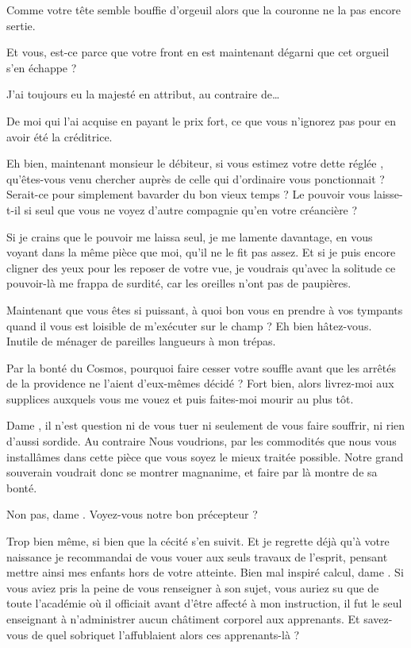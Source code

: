 \begin{drama}
  \reinespeaks Comme votre tête semble bouffie d’orgeuil alors que la couronne ne la pas encore sertie.

  \elenaspeaks Et vous, est-ce parce que votre front en est maintenant dégarni que cet orgueil s’en échappe ?

  \reinespeaks J’ai toujours eu la majesté en attribut, au contraire de…

  \elenaspeaks De moi qui l’ai acquise en payant le prix fort, ce que vous n’ignorez pas pour en avoir été la créditrice.

  \reinespeaks Eh bien, maintenant monsieur le débiteur, si vous estimez votre dette réglée , qu’êtes-vous venu chercher auprès de celle qui d’ordinaire vous ponctionnait ? Serait-ce pour simplement bavarder du bon vieux temps ? Le pouvoir vous laisse-t-il si seul que vous ne voyez d’autre compagnie qu’en votre créancière ?

  \elenaspeaks Si je crains que le pouvoir me laissa seul, je me lamente davantage, en vous voyant dans la même pièce que moi, qu’il ne le fit pas assez. Et si je puis encore cligner des yeux pour les reposer de votre vue, je voudrais qu’avec la solitude ce pouvoir-là me frappa de surdité, car les oreilles n’ont pas de paupières.

  \reinespeaks Maintenant que vous êtes si puissant, à quoi bon vous en prendre à vos tympants quand il vous est loisible de m’exécuter sur le champ ? Eh bien hâtez-vous. Inutile de ménager de pareilles langueurs à mon trépas.

  \elenaspeaks Par la bonté du Cosmos, pourquoi faire cesser votre souffle avant que les arrêtés de la providence ne l’aient d’eux-mêmes décidé ?
  \reinespeaks Fort bien, alors livrez-moi aux supplices auxquels vous me vouez et puis faites-moi mourir au plus tôt.

  \elenaspeaks Dame \reine, il n’est question ni de vous tuer ni seulement de vous faire souffrir, ni rien d’aussi sordide. Au contraire Nous voudrions, par les commodités que nous vous installâmes dans cette pièce que vous soyez le mieux traitée possible.
  \reinespeaks Notre grand souverain voudrait donc se montrer magnanime, et faire par là montre de sa bonté.

  \elenaspeaks {} Non pas, dame \reine. Voyez-vous notre bon précepteur \alexas ?

  \reinespeaks Trop bien même, si bien que la cécité s’en suivit. Et je regrette déjà qu’à votre naissance je recommandai de vous vouer aux seuls travaux de l’esprit, pensant mettre ainsi mes enfants hors de votre atteinte.
  \elenaspeaks Bien mal inspiré calcul, dame \reine. Si vous aviez pris la peine de vous renseigner à son sujet, vous auriez su que de toute l’académie où il officiait avant d’être affecté à mon instruction, il fut le seul enseignant à n’administrer aucun châtiment corporel aux apprenants. Et savez-vous de quel sobriquet l’affublaient alors ces apprenants-là ?


\end{drama}
